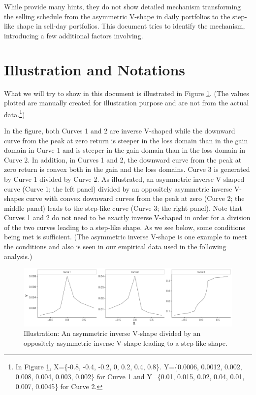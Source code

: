 \documentclass[11pt, a4paper]{article}
\begin{document}
While \citet{BenDavidHirshleifer12} provide many hints, they do not show detailed mechanism transforming the selling schedule from the asymmetric V-shape in daily portfolios to the step-like shape in sell-day portfolios. This document tries to identify the mechanism, introducing a few additional factors involving.      

\section{Illustration and Notations}
What we will try to show in this document is illustrated in Figure \ref{figure:illustration}. (The values plotted are manually created for illustration purpose and are not from the actual data.\footnote{In Figure \ref{figure:illustration}, X=\{-0.8, -0.4, -0.2, 0, 0.2, 0.4, 0.8\}. Y=\{0.0006, 0.0012, 0.002, 0.008, 0.004, 0.003, 0.002\} for Curve 1 and Y=\{0.01, 0.015, 0.02, 0.04, 0.01, 0.007, 0.0045\} for Curve 2.}) 

In the figure, both Curves 1 and 2 are inverse V-shaped while the downward curve from the peak at zero return is steeper in the loss domain than in the gain domain in Curve 1 and is steeper in the gain domain than in the loss domain in Curve 2. In addition, in Curves 1 and 2, the downward curve from the peak at zero return is convex both in the gain and the loss domains. Curve 3 is generated by Curve 1 divided by Curve 2. As illustrated, an asymmetric inverse V-shaped curve (Curve 1; the left panel) divided by an oppositely asymmetric inverse V-shapes curve with convex downward curves from the peak at zero (Curve 2; the middle panel) leads to the step-like curve (Curve 3; the right panel). Note that Curves 1 and 2 do not need to be exactly inverse V-shaped in order for a division of the two curves leading to a step-like shape. As we see below, some conditions being met is sufficient. (The asymmetric inverse V-shape is one example to meet the conditions and also is seen in our empirical data used in the following analysis.)


\begin{figure}[H]
	\centering
	\includegraphics[width=1.1\columnwidth]{illustration.pdf}
	\caption{\small Illustration: An asymmetric inverse  V-shape divided by an oppositely asymmetric inverse V-shape leading to a step-like shape.}
	\label{figure:illustration}
\end{figure}
\end{document}
